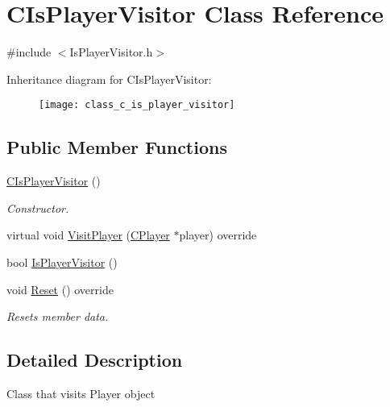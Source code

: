\hypertarget{class_c_is_player_visitor}{}\section{C\+Is\+Player\+Visitor Class Reference}
\label{class_c_is_player_visitor}


{\ttfamily \#include $<$Is\+Player\+Visitor.\+h$>$}

Inheritance diagram for C\+Is\+Player\+Visitor\+:\begin{figure}[H]
\begin{center}
\leavevmode
\texttt{[image: class\_c\_is\_player\_visitor]}
\end{center}
\end{figure}
\subsection*{Public Member Functions}
\begin{DoxyCompactItemize}
\item 
\mbox{\label{class_c_is_player_visitor_a2c53bdc67a585e9a43b07ff21ed874e9}} 
\mbox{\hyperlink{class_c_is_player_visitor_a2c53bdc67a585e9a43b07ff21ed874e9}{C\+Is\+Player\+Visitor}} ()
\begin{DoxyCompactList}\small\item\em Constructor. \end{DoxyCompactList}\item 
virtual void \mbox{\hyperlink{class_c_is_player_visitor_ade10af41a195ead29f30ed6fffb4c3bd}{Visit\+Player}} (\mbox{\hyperlink{class_c_player}{C\+Player}} $\ast$player) override
\item 
bool \mbox{\hyperlink{class_c_is_player_visitor_ad5fa4aa38887229cca980a8c362e3ff8}{Is\+Player\+Visitor}} ()
\item 
\mbox{\label{class_c_is_player_visitor_a7d0c122f99de41b5c03acf476afb5ed6}} 
void \mbox{\hyperlink{class_c_is_player_visitor_a7d0c122f99de41b5c03acf476afb5ed6}{Reset}} () override
\begin{DoxyCompactList}\small\item\em Resets member data. \end{DoxyCompactList}\end{DoxyCompactItemize}


\subsection{Detailed Description}
Class that visits Player object 

